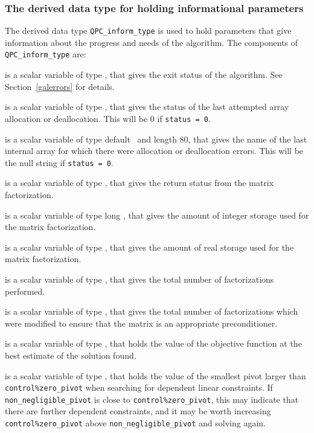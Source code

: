 \documentclass{galahad}
\newcommand{\packagename}{QPC}
\begin{document}



\subsubsection{The derived data type for holding informational
 parameters}\label{typeinform}
The derived data type 
{\tt \packagename\_inform\_type} 
is used to hold parameters that give information about the progress and needs 
of the algorithm. The components of 
{\tt \packagename\_inform\_type} 
are:

\begin{description}

 is a scalar variable of type \integer, that gives the
exit status of the algorithm. 
See Section~\ref{galerrors} 
for details.

 is a scalar variable of type \integer, that gives
the status of the last attempted array allocation or deallocation.
This will be 0 if {\tt status = 0}.

 is a scalar variable of type default \character\
and length 80, that  gives the name of the last internal array 
for which there were allocation or deallocation errors.
This will be the null string if {\tt status = 0}. 

 is a scalar variable of type \integer, that 
gives the return status from the matrix factorization.

 is a scalar variable of type long
\integer, that gives the amount of integer storage used for the matrix 
factorization.

 is a scalar variable of type \longinteger, 
that gives the amount of real storage used for the matrix factorization.

 is a scalar variable of type \integer, that gives the
total number of factorizations performed.

 is a scalar variable of type \integer, that gives the
total number of factorizations which were modified to 
ensure that the matrix is an appropriate preconditioner. 

 is a scalar variable of type \realdp, that holds the
value of the objective function at the best estimate of the solution found.

 is a scalar variable of type \realdp, 
that holds the value of the smallest pivot larger than {\tt control\%zero\_pivot}
when searching for dependent linear constraints. If 
{\tt non\_negligible\_pivot} is close to  {\tt control\%zero\_pivot},
this may indicate that there are further dependent constraints, and
it may be worth increasing {\tt control\%zero\_pivot} above 
{\tt non\_negligible\_pivot} and solving again.


\end{description}
\end{document}
